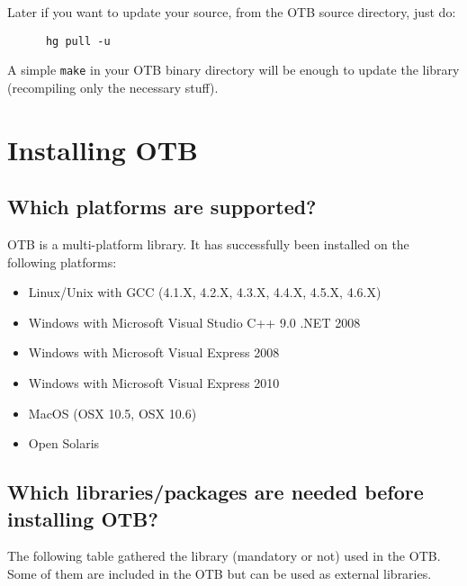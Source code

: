 Later if you want to update your source, from the OTB source directory, just do:
\begin{verbatim}
      hg pull -u
\end{verbatim}

A simple \texttt{make} in your OTB binary directory will be enough to update the library (recompiling only the necessary stuff).


\section{Installing OTB}
\label{sec:FAQInstall}
\subsection{Which platforms are supported?}
OTB is a multi-platform library. It has successfully been installed on
the following platforms:
\begin{itemize}
  \item Linux/Unix with GCC (4.1.X, 4.2.X, 4.3.X, 4.4.X, 4.5.X, 4.6.X)
  \item Windows with Microsoft Visual Studio C++ 9.0 .NET 2008
  \item Windows with Microsoft Visual Express 2008
  \item Windows with Microsoft Visual Express 2010
  \item MacOS (OSX 10.5, OSX 10.6)
  \item Open Solaris
\end{itemize}

\subsection{Which libraries/packages are needed before installing
 OTB?}
The following table gathered the library (mandatory or not) used in the OTB. Some of them are included in the OTB but can be used as external libraries.

